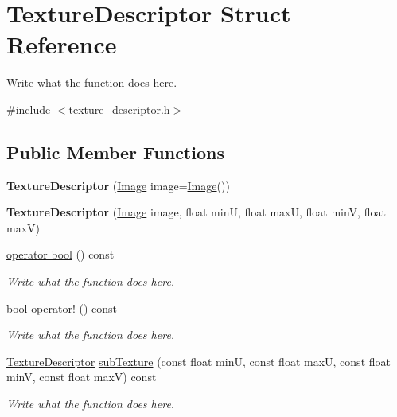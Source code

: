 \hypertarget{structTextureDescriptor}{\section{Texture\+Descriptor Struct Reference}
\label{structTextureDescriptor}
}


Write what the function does here.  




{\ttfamily \#include $<$texture\+\_\+descriptor.\+h$>$}

\subsection*{Public Member Functions}
\begin{DoxyCompactItemize}
\item 
\hypertarget{structTextureDescriptor_a96245b9611b645eac88050ef4d70f2c2}{{\bfseries Texture\+Descriptor} (\hyperlink{classImage}{Image} image=\hyperlink{classImage}{Image}())}\label{structTextureDescriptor_a96245b9611b645eac88050ef4d70f2c2}

\item 
\hypertarget{structTextureDescriptor_affe5fe65a87405a17a428fe725dc78c3}{{\bfseries Texture\+Descriptor} (\hyperlink{classImage}{Image} image, float min\+U, float max\+U, float min\+V, float max\+V)}\label{structTextureDescriptor_affe5fe65a87405a17a428fe725dc78c3}

\item 
\hyperlink{structTextureDescriptor_a41a7fa119f03e28d9b3ae556fb6ff268}{operator bool} () const 
\begin{DoxyCompactList}\small\item\em Write what the function does here. \end{DoxyCompactList}\item 
bool \hyperlink{structTextureDescriptor_ad0465f550a605451e2c40a31a491c7b6}{operator!} () const 
\begin{DoxyCompactList}\small\item\em Write what the function does here. \end{DoxyCompactList}\item 
\hyperlink{structTextureDescriptor}{Texture\+Descriptor} \hyperlink{structTextureDescriptor_a03c94da9644d4992e51768aca4eb22ae}{sub\+Texture} (const float min\+U, const float max\+U, const float min\+V, const float max\+V) const 
\begin{DoxyCompactList}\small\item\em Write what the function does here. \end{DoxyCompactList}\end{DoxyCompactItemize}
